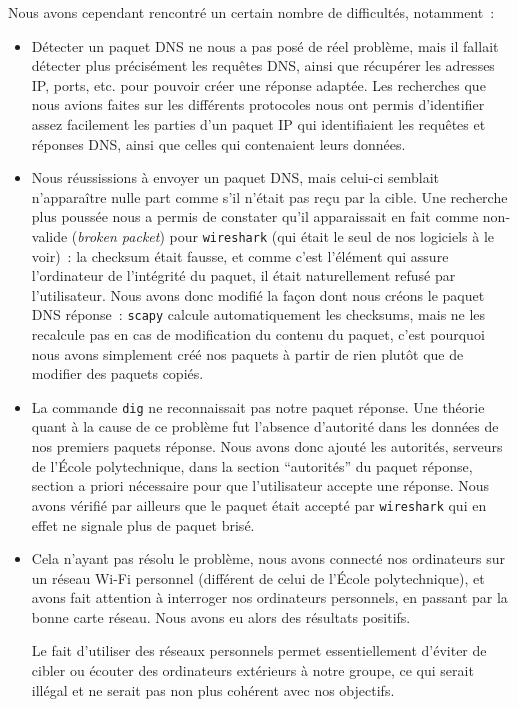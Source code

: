 \documentclass[a4paper, 12pt,twoside]{article}
\begin{document}
            \noindent Nous avons cependant rencontré un certain nombre de difficultés, notamment~:
            \begin{itemize}[label=\color{bleu303}\textbullet{}]
                \item Détecter un paquet DNS ne nous a pas posé de réel problème, mais il fallait détecter plus précisément les requêtes DNS, ainsi que récupérer les adresses IP, ports, etc. pour pouvoir créer une réponse adaptée. Les recherches que nous avions faites sur les différents protocoles nous ont permis d'identifier assez facilement les parties d'un paquet IP qui identifiaient les requêtes et réponses DNS, ainsi que celles qui contenaient leurs données.
                \item Nous réussissions à envoyer un paquet DNS, mais celui-ci semblait n'apparaître nulle part comme s'il n'était pas reçu par la cible. Une recherche plus poussée nous a permis de constater qu'il apparaissait en fait comme non-valide (\emph{broken packet}) pour \verb!wireshark! (qui était le seul de nos logiciels à le voir)~: la checksum était fausse, et comme c'est l'élément qui assure l'ordinateur de l'intégrité du paquet, il était naturellement refusé par l'utilisateur. Nous avons donc modifié la façon dont nous créons le paquet DNS réponse~: \verb!scapy! calcule automatiquement les checksums, mais ne les recalcule pas en cas de modification du contenu du paquet, c'est pourquoi nous avons simplement créé nos paquets à partir de rien plutôt que de modifier des paquets copiés.
                \item La commande \verb!dig! ne reconnaissait pas notre paquet réponse. Une théorie quant à la cause de ce problème fut l'absence d'autorité dans les données de nos premiers paquets réponse. Nous avons donc ajouté les autorités, serveurs de l'École polytechnique, dans la section “autorités” du paquet réponse, section a priori nécessaire pour que l'utilisateur accepte une réponse. Nous avons vérifié par ailleurs que le paquet était accepté par \verb!wireshark! qui en effet ne signale plus de paquet brisé.
                \item Cela n'ayant pas résolu le problème, nous avons connecté nos ordinateurs sur un réseau Wi-Fi personnel (différent de celui de l'École polytechnique), et avons fait attention à interroger nos ordinateurs personnels, en passant par la bonne carte réseau. Nous avons eu alors des résultats positifs.

                Le fait d'utiliser des réseaux personnels permet essentiellement d'éviter de cibler ou écouter des ordinateurs extérieurs à notre groupe, ce qui serait illégal et ne serait pas non plus cohérent avec nos objectifs.


\end{itemize}
\end{document}
